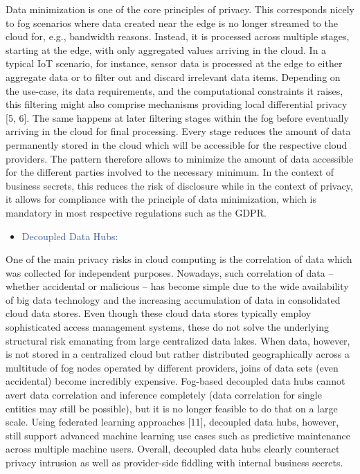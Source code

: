 \documentclass[11pt]{article}
\begin{document}
{\large Data minimization is one of the core principles of privacy. This corresponds nicely to fog scenarios where data created near the edge is no longer streamed to the cloud for, e.g., bandwidth reasons. Instead, it is processed across multiple stages, starting at the edge, with only aggregated values arriving in the cloud. In a typical IoT scenario, for instance, sensor data is processed at the edge to either aggregate data or to filter out and discard irrelevant data items. Depending on the use-case, its data requirements, and the computational constraints it raises, this filtering might also comprise mechanisms providing local differential privacy [5, 6]. The same happens at later filtering stages within the fog before eventually arriving in the cloud for final processing. Every stage reduces the amount of data permanently stored in the cloud which will be accessible for the respective cloud providers. The pattern therefore allows to minimize the amount of data accessible for the different parties involved to the necessary minimum. In the context of business secrets, this reduces the risk of disclosure while in the context of privacy, it allows for compliance with the principle of data minimization, which is mandatory in most respective regulations such as the GDPR.\par}



\newpage

\begin{itemize}
\item {\Large \textcolor[HTML]{2F5496}{Decoupled Data Hubs:}}
\end{itemize}

{\large One of the main privacy risks in cloud computing is the correlation of data which was collected for independent purposes. Nowadays, such correlation of data – whether accidental or malicious – has become simple due to the wide availability of big data technology and the increasing accumulation of data in consolidated cloud data stores. Even though these cloud data stores typically employ sophisticated access management systems, these do not solve the underlying structural risk emanating from large centralized data lakes. When data, however, is not stored in a centralized cloud but rather distributed geographically across a multitude of fog nodes operated by different providers, joins of data sets (even accidental) become incredibly expensive. Fog-based decoupled data hubs cannot avert data correlation and inference completely (data correlation for single entities may still be possible), but it is no longer feasible to do that on a large scale. Using federated learning approaches [11], decoupled data hubs, however, still support advanced machine learning use cases such as predictive maintenance across multiple machine users. Overall, decoupled data hubs clearly counteract privacy intrusion as well as provider-side fiddling with internal business secrets.\par}
\end{document}
